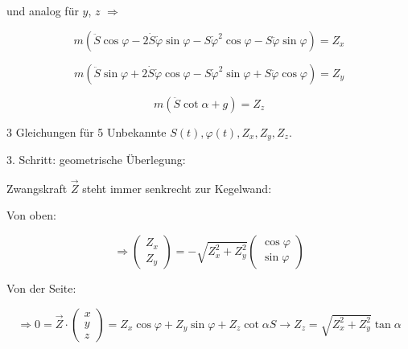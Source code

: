 \documentclass[10pt, letterpaper]{article}
\begin{document}
und analog für $y$, $z$ $\Rightarrow$

\begin{equation}
m(\ddot{S}\cos\varphi - 2\dot{S}\dot{\varphi}\sin\varphi - S\dot{\varphi}^2\cos\varphi - S\ddot{\varphi}\sin\varphi) = Z_x \tag{1}
\end{equation}

\begin{equation}
m(\ddot{S}\sin\varphi + 2\dot{S}\dot{\varphi}\cos\varphi - S\dot{\varphi}^2\sin\varphi + S\ddot{\varphi}\cos\varphi) = Z_y \tag{2}
\end{equation}

\begin{equation}
m(\ddot{S}\cot\alpha + g) = Z_z \tag{3}
\end{equation}

3 Gleichungen für 5 Unbekannte $S(t), \varphi(t), Z_x, Z_y, Z_z$.

3. Schritt: geometrische Überlegung: 

Zwangskraft $\vec{Z}$ steht immer senkrecht zur Kegelwand:


Von oben: 

\[\Rightarrow \begin{pmatrix} Z_x \\ Z_y \end{pmatrix} = -\sqrt{Z_x^2+Z_y^2}\begin{pmatrix} \cos\varphi \\ \sin\varphi \end{pmatrix} \tag{4}\]

Von der Seite: 
\[\Rightarrow 0 = \vec{Z} \cdot \begin{pmatrix} x \\ y \\ z \end{pmatrix} = Z_x\cos\varphi + Z_y\sin\varphi+Z_z\cot\alpha S \rightarrow Z_z = \sqrt{Z_x^2+Z_y^2}\tan\alpha\]
\end{document}
